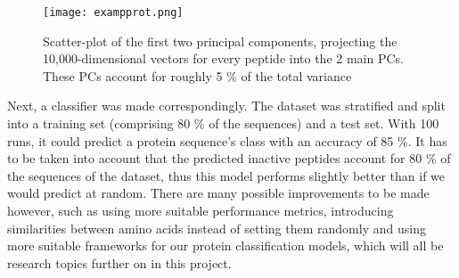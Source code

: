 \begin{figure}[H]
    \centering
    \texttt{[image: exampprot.png]}
    \caption{Scatter-plot of the first two principal components, projecting the 10,000-dimensional vectors for every peptide into the 2 main PCs. These PCs account for roughly 5 \% of the total variance}
    \label{fig:diagram_exprot}
\end{figure}

Next, a classifier was made correspondingly. The dataset was stratified and split into a training set (comprising 80 \% of the sequences) and a test set. With 100 runs, it could predict a protein sequence's class with an accuracy of 85 \%. It has to be taken into account that the predicted inactive peptides account for 80 \% of the sequences of the dataset, thus this model performs slightly better than if we would predict at random. There are many possible improvements to be made however, such as using more suitable performance metrics, introducing similarities between amino acids instead of setting them randomly and using more suitable frameworks for our protein classification models, which will all be research topics further on in this project.